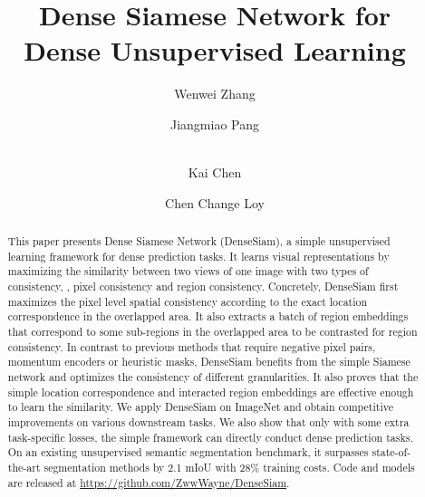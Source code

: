 \documentclass[runningheads]{llncs}
\begin{document}
\pagestyle{headings}
\mainmatter

\def\ECCVSubNumber{2631}  

\title{Dense Siamese Network for \\Dense Unsupervised Learning} 

\begin{comment}
\titlerunning{ECCV-22 submission ID \ECCVSubNumber} 
\authorrunning{ECCV-22 submission ID \ECCVSubNumber} 
\author{Anonymous ECCV submission}
\institute{Paper ID \ECCVSubNumber}
\end{comment}


\author{Wenwei Zhang \and
Jiangmiao Pang \and\\
Kai Chen \and
Chen Change Loy\inst{1\textrm{\Letter}}}
\maketitle
\begin{abstract}
This paper presents Dense Siamese Network (DenseSiam), a simple unsupervised learning framework for dense prediction tasks.
It learns visual representations by maximizing the similarity between two views of one image with two types of consistency, \ie, pixel consistency and region consistency.
Concretely, DenseSiam first maximizes the pixel level spatial consistency according to the exact location correspondence in the overlapped area. 
It also extracts a batch of region embeddings that correspond to some sub-regions in the overlapped area to be contrasted for region consistency. 
In contrast to previous methods that require negative pixel pairs, momentum encoders or heuristic masks, DenseSiam benefits from the simple Siamese network and optimizes the consistency of different granularities. 
It also proves that the simple location correspondence and interacted region embeddings are effective enough to learn the similarity.
We apply DenseSiam on ImageNet and obtain competitive improvements on various downstream tasks.
We also show that only with some extra task-specific losses, the simple framework can directly conduct dense prediction tasks.
On an existing unsupervised semantic segmentation benchmark, it surpasses state-of-the-art segmentation methods by 2.1 mIoU with 28\% training costs.
Code and models are released at \url{https://github.com/ZwwWayne/DenseSiam}.

\end{abstract}
\end{document}
